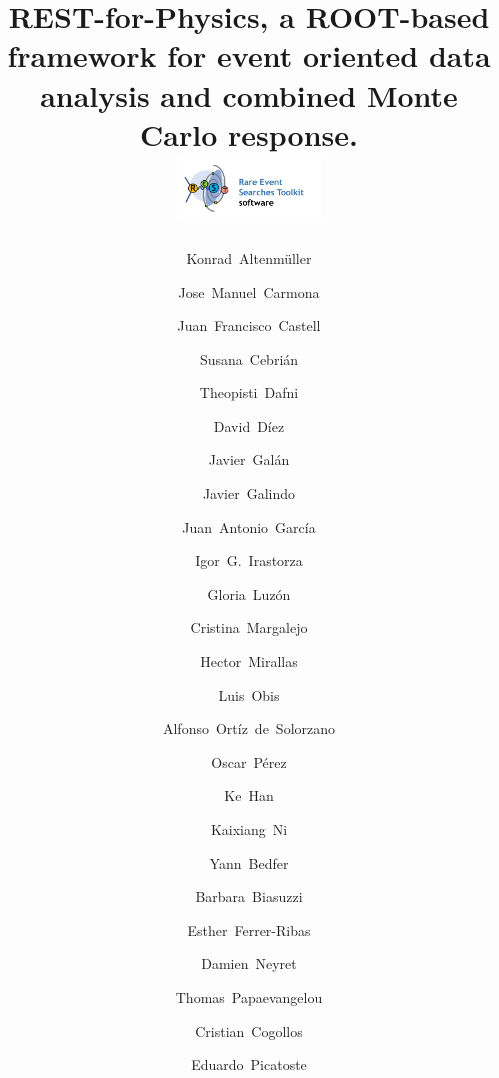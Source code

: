 \documentclass[article]{elsarticle}
\begin{document}
\begin{frontmatter}

\title{REST-for-Physics, a ROOT-based framework for event oriented data analysis and combined Monte Carlo response.\\ \includegraphics[height=18mm]{RESTlogoFull.png}}


\author{Konrad~Altenm\"uller}
\author{Jose~Manuel~Carmona}
\author{Juan~Francisco~Castell}
\author{Susana~Cebri\'an}
\author{Theopisti~Dafni}
\author{David~D\'iez}
\author{Javier~Gal\'an}
\author{Javier~Galindo}
\author{Juan~Antonio~Garc\'ia}
\author{Igor~G.~Irastorza}
\author{Gloria~Luz\'on}
\author{Cristina~Margalejo}
\author{Hector~Mirallas}
\author{Luis~Obis}
\author{Alfonso~Ort\'iz~de~Solorzano}
\author{Oscar~P\'erez}

\address{Center for Astroparticles and High Energy Physics (CAPA), Universidad de Zaragoza, 50009 Zaragoza, Spain}

\author{Ke~Han}
\author{Kaixiang~Ni}
\address{INPAC and School of Physics and Astronomy, Shanghai Jiao Tong University, Shanghai Laboratory for Particle Physics and Cosmology, Shanghai 200240, China}


\author{Yann~Bedfer}
\author{Barbara~Biasuzzi}
\author{Esther~Ferrer-Ribas}
\author{Damien~Neyret}
\author{Thomas~Papaevangelou}
\address{IRFU, CEA, Universit\'e Paris-Saclay, F-91191 Gif-sur-Yvette, France}

\author{Cristian~Cogollos}
\author{Eduardo~Picatoste}
\address{Institut de Ci\`encies del Cosmos, Universitat de Barcelona, Barcelona, Spain}
\address{Departament de F\'isica Qu\`antica i Astrof\'isica, Universitat de Barcelona, Barcelona, Spain}




\end{frontmatter}
\end{document}

